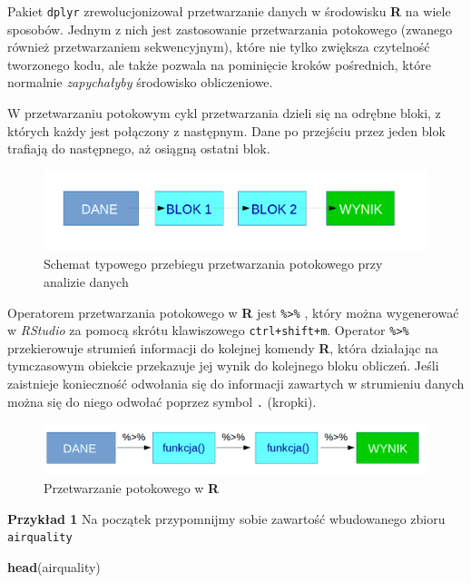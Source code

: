 \documentclass[]{book}
\newenvironment{Shaded}{\begin{snugshade}}{\end{snugshade}}
\newcommand{\KeywordTok}[1]{\textcolor[rgb]{0.13,0.29,0.53}{\textbf{#1}}}
\newcommand{\NormalTok}[1]{#1}
\theoremstyle{definition}
\theoremstyle{definition}
\theoremstyle{definition}
\theoremstyle{remark}
\begin{document}
Pakiet \texttt{dplyr} zrewolucjonizował przetwarzanie danych w
środowisku \textbf{R} na wiele sposobów. Jednym z nich jest zastosowanie
przetwarzania potokowego (zwanego również przetwarzaniem sekwencyjnym),
które nie tylko zwiększa czytelność tworzonego kodu, ale także pozwala
na pominięcie kroków pośrednich, które normalnie \emph{zapychałyby}
środowisko obliczeniowe.

W przetwarzaniu potokowym cykl przetwarzania dzieli się na odrębne
bloki, z których każdy jest połączony z następnym. Dane po przejściu
przez jeden blok trafiają do następnego, aż osiągną ostatni blok.

\begin{figure}
\centering
\includegraphics{figures/przetwarzanie_potokowe1.png}
\caption{Schemat typowego przebiegu przetwarzania potokowego przy
analizie danych}
\end{figure}

Operatorem przetwarzania potokowego w \textbf{R} jest
\texttt{\%\textgreater{}\%} , który można wygenerować w \emph{RStudio}
za pomocą skrótu klawiszowego \texttt{ctrl+shift+m}. Operator
\texttt{\%\textgreater{}\%} przekierowuje strumień informacji do
kolejnej komendy \textbf{R}, która działając na tymczasowym obiekcie
przekazuje jej wynik do kolejnego bloku obliczeń. Jeśli zaistnieje
konieczność odwołania się do informacji zawartych w strumieniu danych
można się do niego odwołać poprzez symbol \texttt{.} (kropki).

\begin{figure}
\centering
\includegraphics{figures/przetwarzanie_potokowe2.png}
\caption{Przetwarzanie potokowego w \textbf{R}}
\end{figure}

\textbf{Przykład 1} Na początek przypomnijmy sobie zawartość wbudowanego
zbioru \texttt{airquality}

\begin{Shaded}
\begin{Highlighting}[]
\KeywordTok{head}\NormalTok{(airquality)}
\end{Highlighting}
\end{Shaded}
\end{document}
